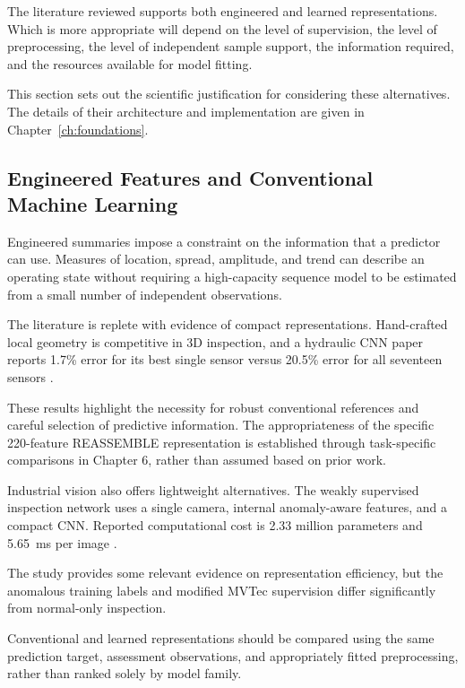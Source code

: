 The literature reviewed supports both engineered and learned representations. Which is more
appropriate will depend on the level of supervision, the level of preprocessing, the level of
independent sample support, the information required, and the resources available for model fitting.

This section sets out the scientific justification for considering these alternatives. The details
of their architecture and implementation are given in Chapter~\ref{ch:foundations}.

\subsection{Engineered Features and Conventional Machine Learning}

Engineered summaries impose a constraint on the information that a predictor can use. Measures of
location, spread, amplitude, and trend can describe an operating state without requiring a
high-capacity sequence model to be estimated from a small number of independent observations.

The literature is replete with evidence of compact representations. Hand-crafted local geometry is
competitive in 3D inspection, and a hydraulic CNN paper reports 1.7\% error for its best single
sensor versus 20.5\% error for all seventeen sensors \parencite{Horwitz2023Back,Goodarzi2023Deep}.

These results highlight the necessity for robust conventional references and careful selection of
predictive information. The appropriateness of the specific 220-feature REASSEMBLE representation is
established through task-specific comparisons in Chapter 6, rather than assumed based on prior work.

Industrial vision also offers lightweight alternatives. The weakly supervised inspection network
uses a single camera, internal anomaly-aware features, and a compact CNN. Reported computational
cost is 2.33 million parameters and 5.65~ms per image \parencite[p.~6661, Table~V]{P035}.

The study provides some relevant evidence on representation efficiency, but the anomalous training
labels and modified MVTec supervision differ significantly from normal-only inspection.

Conventional and learned representations should be compared using the same prediction target,
assessment observations, and appropriately fitted preprocessing, rather than ranked solely by model
family.

